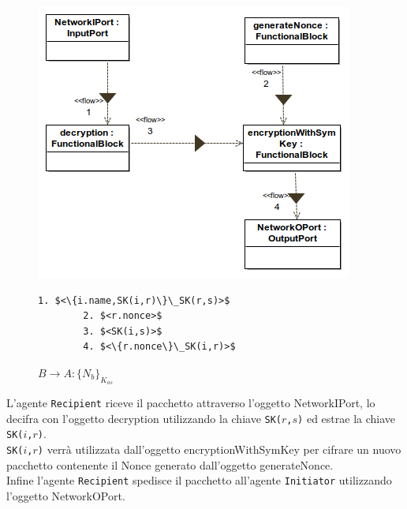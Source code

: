 \begin{figure}[h!] 
    \centering 
    \includegraphics[scale=0.59]{../img/NSSK/SecondMessage.png} 
    \begin{lstlisting}[frame=single, mathescape, basicstyle=\footnotesize]
        1. $<\{i.name,SK(i,r)\}\_SK(r,s)>$
        2. $<r.nonce>$
        3. $<SK(i,s)>$
        4. $<\{r.nonce\}\_SK(i,r)>$
    \end{lstlisting}
    \caption{$B \rightarrow A : \{N_b\}_{K_{as}}$} 
\end{figure}
\newpage
\noindent L'agente \texttt{Recipient} riceve il pacchetto attraverso l'oggetto NetworkIPort, lo decifra con l'oggetto decryption utilizzando la chiave \texttt{SK($r$,$s$)} ed estrae la chiave \texttt{SK($i$,$r$)}.\\ 
\texttt{SK($i$,$r$)} verrà utilizzata dall'oggetto encryptionWithSymKey per cifrare un nuovo pacchetto contenente il Nonce generato dall'oggetto generateNonce.\\ 
Infine l'agente \texttt{Recipient} spedisce il pacchetto all'agente \texttt{Initiator} utilizzando l'oggetto NetworkOPort.\\
